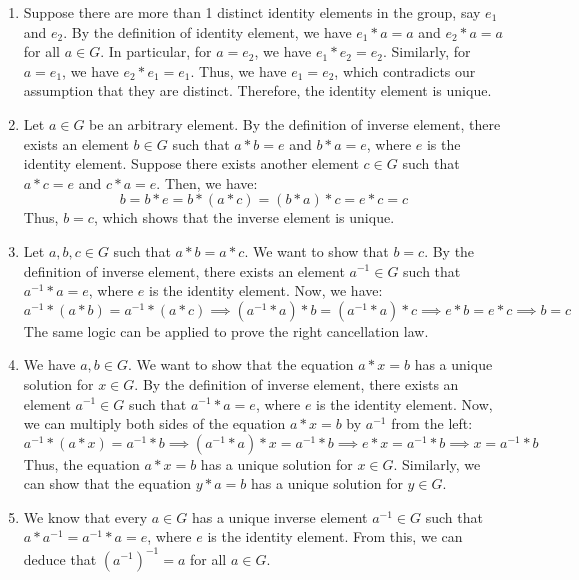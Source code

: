 \documentclass[openany]{book}
\begin{document}
\begin{enumerate}
    \item Suppose there are more than 1 distinct identity elements in the group, say \( e_1 \) and \( e_2 \). By the definition of identity element, we have \( e_1 * a = a \) and \( e_2 * a = a \) for all \( a \in G \). In particular, for \( a = e_2 \), we have \( e_1 * e_2 = e_2 \). Similarly, for \( a = e_1 \), we have \( e_2 * e_1 = e_1 \). Thus, we have \( e_1 = e_2 \), which contradicts our assumption that they are distinct. Therefore, the identity element is unique.
    \item Let \( a \in G \) be an arbitrary element. By the definition of inverse element, there exists an element \( b \in G \) such that \( a * b = e \) and \( b * a = e \), where \( e \) is the identity element. Suppose there exists another element \( c \in G \) such that \( a * c = e \) and \( c * a = e \). Then, we have:
    \[
    b = b * e = b * (a * c) = (b * a) * c = e * c = c
    \]
    Thus, \( b = c \), which shows that the inverse element is unique.
    \item Let \( a, b, c \in G \) such that \( a * b = a * c \). We want to show that \( b = c \). By the definition of inverse element, there exists an element \( a^{-1} \in G \) such that \( a^{-1} * a = e \), where \( e \) is the identity element. Now, we have:
    \[
    a^{-1} * (a * b) = a^{-1} * (a * c) \implies (a^{-1} * a) * b = (a^{-1} * a) * c \implies e * b = e * c \implies b = c  
    \]
    The same logic can be applied to prove the right cancellation law.
    \item We have \( a, b \in G \). We want to show that the equation \( a * x = b \) has a unique solution for \( x \in G \). By the definition of inverse element, there exists an element \( a^{-1} \in G \) such that \( a^{-1} * a = e \), where \( e \) is the identity element. Now, we can multiply both sides of the equation \( a * x = b \) by \( a^{-1} \) from the left:
    \[
    a^{-1} * (a * x) = a^{-1} * b \implies (a^{-1} * a) * x = a^{-1} * b \implies e * x = a^{-1} * b \implies x = a^{-1} * b
    \]
    Thus, the equation \( a * x = b \) has a unique solution for \( x \in G \). Similarly, we can show that the equation \( y * a = b \) has a unique solution for \( y \in G \).
    \item We know that every $a \in G$ has a unique inverse element $a^{-1} \in G$ such that $a * a^{-1} = a^{-1} * a = e$, where $e$ is the identity element. From this, we can deduce that $(a^{-1})^{-1} = a$ for all $a \in G$. \\

\end{enumerate}
\end{document}

